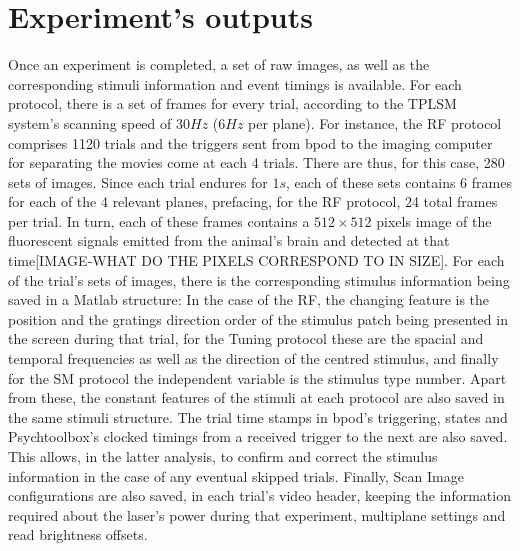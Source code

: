 \section{Experiment's outputs}
\label{sec:Experimentsoutputs}

Once an experiment is completed, a set of raw images, as well as the corresponding stimuli information and event timings is available. For each protocol, there is a set of frames for every trial, according to the TPLSM system's scanning speed of $30 Hz$ ($6 Hz$ per plane). 
For instance, the RF protocol comprises 1120 trials and the triggers sent from bpod to the imaging computer for separating the movies come at each 4 trials. There are thus, for this case, 280 sets of images. Since each trial endures for $1s$, each of these sets contains 6 frames for each of the 4 relevant planes, prefacing, for the RF protocol, 24 total frames per trial. In turn, each of these frames contains a $512 \times 512$ pixels image of the fluorescent signals emitted from the animal's brain and detected at that time[IMAGE-WHAT DO THE PIXELS CORRESPOND TO IN SIZE].
For each of the trial's sets of images, there is the corresponding stimulus information being saved in a Matlab structure: In the case of the RF, the changing feature is the position and the gratings direction order of the stimulus patch being presented in the screen during that trial, for the Tuning protocol these are the spacial and temporal frequencies as well as the direction of the centred stimulus, and finally for the SM protocol the independent variable is the stimulus type number. Apart from these, the constant features of the stimuli at each protocol are also saved in the same stimuli structure. 
The trial time stamps in bpod's triggering, states and Psychtoolbox's clocked timings from a received trigger to the next are also saved. This allows, in the latter analysis, to confirm and correct the stimulus information in the case of any eventual skipped trials.
Finally, Scan Image configurations are also saved, in each trial's video header, keeping the information required about the laser's power during that experiment, multiplane settings and read brightness offsets.